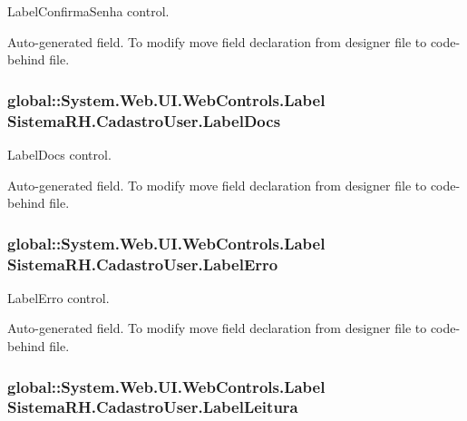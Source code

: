 LabelConfirmaSenha control. 

Auto-\/generated field. To modify move field declaration from designer file to code-\/behind file. \hypertarget{class_sistema_r_h_1_1_cadastro_user_aaeb55ba4d615da19496bdd9cca8830d0}{
\subsubsection[{LabelDocs}]{\setlength{\rightskip}{0pt plus 5cm}global::System.Web.UI.WebControls.Label {\bf SistemaRH.CadastroUser.LabelDocs}}}
\label{class_sistema_r_h_1_1_cadastro_user_aaeb55ba4d615da19496bdd9cca8830d0}


LabelDocs control. 

Auto-\/generated field. To modify move field declaration from designer file to code-\/behind file. \hypertarget{class_sistema_r_h_1_1_cadastro_user_aaccd2e2ae995aa1d687ca7a609eb9a4c}{
\subsubsection[{LabelErro}]{\setlength{\rightskip}{0pt plus 5cm}global::System.Web.UI.WebControls.Label {\bf SistemaRH.CadastroUser.LabelErro}}}
\label{class_sistema_r_h_1_1_cadastro_user_aaccd2e2ae995aa1d687ca7a609eb9a4c}


LabelErro control. 

Auto-\/generated field. To modify move field declaration from designer file to code-\/behind file. \hypertarget{class_sistema_r_h_1_1_cadastro_user_a5854d3064b2bd301797b09d1da2575f6}{
\subsubsection[{LabelLeitura}]{\setlength{\rightskip}{0pt plus 5cm}global::System.Web.UI.WebControls.Label {\bf SistemaRH.CadastroUser.LabelLeitura}}}
\label{class_sistema_r_h_1_1_cadastro_user_a5854d3064b2bd301797b09d1da2575f6}


